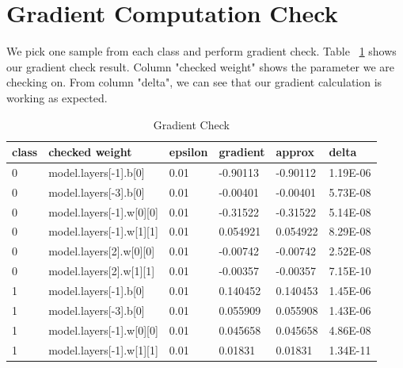 \documentclass{article} %
\begin{document}
\section{Gradient Computation Check}
We pick one sample from each class and perform gradient check. Table ~\ref{table:gradCheck} shows our gradient check result. Column "checked weight" shows the parameter we are checking on. From column "delta", we can see that our gradient calculation is working as expected.
\begin{table}[]
\caption{Gradient Check}
\label{table:gradCheck}
\begin{tabular}{|l|l|l|l|l|l|}
\hline
\textbf{class} & \textbf{checked weight}              & \textbf{epsilon} & \textbf{gradient} & \textbf{approx} & \textbf{delta} \\ \hline
0              & model.layers{[}-1{]}.b{[}0{]}        & 0.01             & -0.90113          & -0.90112        & 1.19E-06       \\ \hline
0              & model.layers{[}-3{]}.b{[}0{]}        & 0.01             & -0.00401          & -0.00401        & 5.73E-08       \\ \hline
0              & model.layers{[}-1{]}.w{[}0{]}{[}0{]} & 0.01             & -0.31522          & -0.31522        & 5.14E-08       \\ \hline
0              & model.layers{[}-1{]}.w{[}1{]}{[}1{]} & 0.01             & 0.054921          & 0.054922        & 8.29E-08       \\ \hline
0              & model.layers{[}2{]}.w{[}0{]}{[}0{]}  & 0.01             & -0.00742          & -0.00742        & 2.52E-08       \\ \hline
0              & model.layers{[}2{]}.w{[}1{]}{[}1{]}  & 0.01             & -0.00357          & -0.00357        & 7.15E-10       \\ \hline
1              & model.layers{[}-1{]}.b{[}0{]}        & 0.01             & 0.140452          & 0.140453        & 1.45E-06       \\ \hline
1              & model.layers{[}-3{]}.b{[}0{]}        & 0.01             & 0.055909          & 0.055908        & 1.43E-06       \\ \hline
1              & model.layers{[}-1{]}.w{[}0{]}{[}0{]} & 0.01             & 0.045658          & 0.045658        & 4.86E-08       \\ \hline
1              & model.layers{[}-1{]}.w{[}1{]}{[}1{]} & 0.01             & 0.01831           & 0.01831         & 1.34E-11       \\ \hline

\end{tabular}
\end{table}
\end{document}
